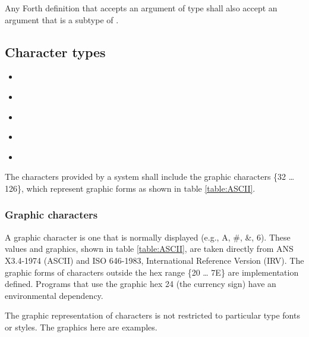 Any Forth definition that accepts an argument of type 
shall also accept an argument that is a subtype of .


\subsection{Character types} %
\label{usage:char}


\begin{itemize}
\item {} \\[-4ex]
\item {} \\[-4ex]
\item {} \\[-4ex]
\item {} \\[-4ex]
\item {}
\end{itemize}

The characters provided by a system shall include the graphic
characters \{32 {\ldots} 126\}, which represent graphic forms
as shown in table \ref{table:ASCII}.

\subsubsection{Graphic characters} %
\label{usage:ASCII}

A graphic character is one that is normally displayed (e.g.,
A, \#, \&, 6). These values and graphics, shown in table
\ref{table:ASCII}, are taken directly from ANS X3.4-1974 (ASCII)
and ISO 646-1983, International Reference Version (IRV). The
graphic forms of characters outside the hex range \{20 {\ldots}
7E\} are implementation defined. Programs that use the graphic hex
24 (the currency sign) have an environmental dependency.

The graphic representation of characters is not restricted to
particular type fonts or styles. The graphics here are examples.

